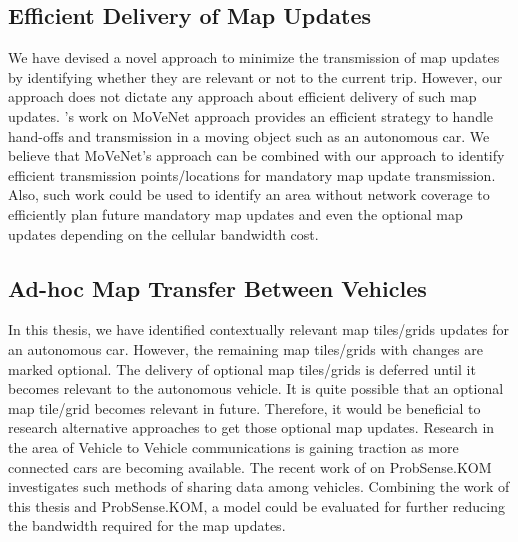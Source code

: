 \subsection{Efficient Delivery of Map Updates}
We have devised a novel approach to minimize the transmission of map updates by identifying whether they are relevant or not to the current trip. However, our approach does not dictate any approach about efficient delivery of such map updates. \citet{movenet}'s work on MoVeNet approach provides an efficient strategy to handle hand-offs and transmission in a moving object such as an autonomous car. We believe that MoVeNet's approach can be combined with our approach to identify efficient transmission points/locations for mandatory map update transmission. Also, such work could be used to identify an area without network coverage to efficiently plan future mandatory map updates and even the optional map updates depending on the cellular bandwidth cost.



\subsection{Ad-hoc Map Transfer Between Vehicles}
In this thesis, we have identified contextually relevant map tiles/grids updates for an autonomous car. However, the remaining map tiles/grids with changes are marked optional. The delivery of optional map tiles/grids is deferred until it becomes relevant to the autonomous vehicle. It is quite possible that an optional map tile/grid becomes relevant in future. Therefore, it would be beneficial to research alternative approaches to get those optional map updates. Research in the area of Vehicle to Vehicle communications is gaining traction as more connected cars are becoming available. The recent work of \citet{probsense} on ProbSense.KOM investigates such methods of sharing data among vehicles. Combining the work of this thesis and ProbSense.KOM, a model could be evaluated for further reducing the bandwidth required for the map updates.






